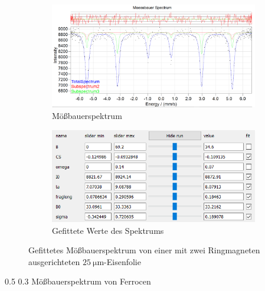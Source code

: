\documentclass[german, %
parskip=full, %
bibliography=totoc, %
]{scrartcl}
\makeatletter
\renewcommand\subsection{\@startsection 
   {subsection}{2}{0mm}%
   {0.5\baselineskip}%
   {0.3\baselineskip}%
   {\bfseries\sffamily\large}%
   }
\makeatother
\begin{document}
\begin{figure}[ht]
	\centering
	\begin{subfigure}[b]{0.5\textwidth}
		\includegraphics[width=\textwidth]{MoessbauerEisen25MagnetRing}
	  \caption{Mößbauerspektrum}
	  \label{fig:moess25ring}
  \end{subfigure}
  \begin{subfigure}[b]{0.4\textwidth}
	  \includegraphics[width=\textwidth]{WerteEisen25MagnetRing}
	  \caption{Gefittete Werte des Spektrums}
	  \label{fig:werte25ring}
  \end{subfigure}
	\caption{Gefittetes Mößbauerspektrum von einer mit zwei Ringmagneten ausgerichteten \(\SI{25}{\micro\meter}\)-Eisenfolie}
\end{figure}

\subsection{Mößbauerspektrum von Ferrocen}
\end{document}
